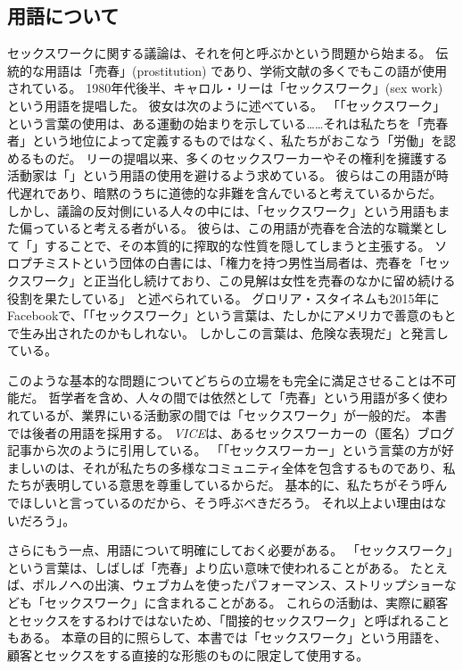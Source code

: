 \documentclass[paper=a4,book,openany]{jlreq} \usepackage{mystyle}
\begin{document}
\subsection{用語について}

セックスワークに関する議論は、それを何と呼ぶかという問題から始まる。
伝統的な用語は「売春」(prostitution) であり、学術文献の多くでもこの語が使用されている。
1980年代後半、キャロル・リーは「セックスワーク」(sex work) という用語を提唱した。
彼女は次のように述べている。
「「セックスワーク」という言葉の使用は、ある運動の始まりを示している……それは私たちを「売春者」という地位によって定義するものではなく、私たちがおこなう「労働」を認めるものだ\citep[p.230]{leigh97:_inven_sex_work}。
リーの提唱以来、多くのセックスワーカーやその権利を擁護する活動家は「」という用語の使用を避けるよう求めている。
彼らはこの用語が時代遅れであり、暗黙のうちに道徳的な非難を含んでいると考えているからだ。
しかし、議論の反対側にいる人々の中には、「セックスワーク」という用語もまた偏っていると考える者がいる。
彼らは、この用語が売春を合法的な職業として「」することで、その本質的に搾取的な性質を隠してしまうと主張する。
ソロプチミストという団体の白書には、「権力を持つ男性当局者は、売春を「セックスワーク」と正当化し続けており、この見解は女性を売春のなかに留め続ける役割を果たしている」
と述べられている\citep{soroptimist17:_prost_is_not_choic}。
グロリア・スタイネムも2015年にFacebookで、「「セックスワーク」という言葉は、たしかにアメリカで善意のもとで生み出されたのかもしれない。
しかしこの言葉は、危険な表現だ」と発言している\citep{steinem15:_faceb}。

このような基本的な問題についてどちらの立場をも完全に満足させることは不可能だ。
哲学者を含め、人々の間では依然として「売春」という用語が多く使われているが、業界にいる活動家の間では「セックスワーク」が一般的だ。
本書では後者の用語を採用する。
\emph{VICE}は、あるセックスワーカーの（匿名）ブログ記事から次のように引用している。
「「セックスワーカー」という言葉の方が好ましいのは、それが私たちの多様なコミュニティ全体を包含するものであり、私たちが表明している意思を尊重しているからだ。
基本的に、私たちがそう呼んでほしいと言っているのだから、そう呼ぶべきだろう。
それ以上よい理由はないだろう」\citep{ratchford13:_why_is_canad_media_still}。

さらにもう一点、用語について明確にしておく必要がある。
「セックスワーク」という言葉は、しばしば「売春」より広い意味で使われることがある。
たとえば、ポルノへの出演、ウェブカムを使ったパフォーマンス、ストリップショーなども「セックスワーク」に含まれることがある。
これらの活動は、実際に顧客とセックスをするわけではないため、「間接的セックスワーク」と呼ばれることもある。
本章の目的に照らして、本書では「セックスワーク」という用語を、顧客とセックスをする直接的な形態のものに限定して使用する。
\end{document}
